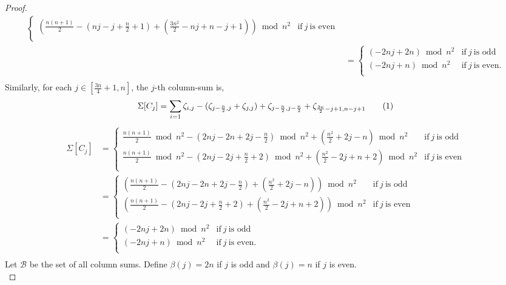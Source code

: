 \documentclass[preprint,11pt]{elsarticle}
\newcommand\numberthis{\addtocounter{equation}{1}\tag{\theequation}}
\begin{document}
\begin{proof}
\begin{align*}
\begin{cases}
         \left(\frac{n(n+1)}{2}-(nj-j+\frac{n}{2}+1)+(\frac{3n^2}{2}-nj+n-j+1)\right)\bmod{n^2} & \text{if}~ j ~ \text{is even}\\ 
    \end{cases}\\[6pt]
    &  =\begin{cases}
       (-2nj +2n)\bmod{n^2}& \text{if}~ j ~ \text{is odd}\\ 
        (-2nj+n)\bmod{n^2} & \text{if}~ j ~ \text{is even}.\\ 
           \end{cases}\\
\end{align*}
Similarly,  for each $j\in[\frac{3n}{4}+1, n]$, the $j$-th column-sum is, \[\Sigma[C_j]= \sum_{i=1}\zeta_{i,j}-(\zeta_{j-\frac{n}{2}, j}+\zeta_{j,j})+\zeta_{j-\frac{n}{2},j- \frac{n}{2}}+\zeta_{\frac{3n}{2}-j+1, n-j+1}\numberthis \label{14}\]
\begin{align*}
     \Sigma[C_j] & =\begin{cases}
        \frac{n(n+1)}{2}\bmod{n^2}-(2nj-2n+2j-\frac{n}{2})\bmod{n^2}+(\frac{n^2}{2}+2j-n)\bmod{n^2} & \text{if}~ j ~ \text{is odd}\\ 
         \frac{n(n+1)}{2}\bmod{n^2}-(2nj-2j+\frac{n}{2}+2)\bmod{n^2}+(\frac{n^2}{2}-2j+n+2)\bmod{n^2} & \text{if}~ j ~ \text{is even}\\ 
    \end{cases}\\[6pt]
    & = \begin{cases}
        \left(\frac{n(n+1)}{2}-(2nj-2n+2j-\frac{n}{2})+(\frac{n^2}{2}+2j-n)\right)\bmod{n^2} & \text{if}~ j ~ \text{is odd}\\ 
         \left(\frac{n(n+1)}{2}-(2nj-2j+\frac{n}{2}+2)+(\frac{n^2}{2}-2j+n+2)\right)\bmod{n^2} & \text{if}~ j ~ \text{is even}\\ 
    \end{cases}\\[6pt]
    &  =\begin{cases}
       (-2nj +2n)\bmod{n^2}& \text{if}~ j ~ \text{is odd}\\ 
        (-2nj+n)\bmod{n^2} & \text{if}~ j ~ \text{is even}.\\ 
           \end{cases}\\
\end{align*}
 Let $\mathcal{B}$ be the set of all column sums. Define
$\beta(j)=
2n$ if $j$ is odd and 
$\beta(j)=n$ if $j$ is even. \\

\end{proof}
\end{document}
